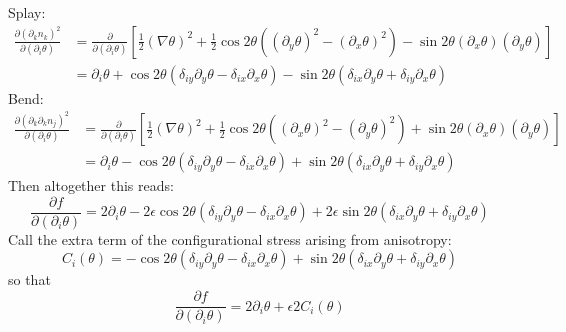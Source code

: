 \documentclass[reqno]{article}
\begin{document}
\noindent
Splay:
\begin{equation}
\begin{split}
    \frac{\partial (\partial_k n_k)^2}{\partial (\partial_i \theta)}
    &=
    \frac{\partial}{\partial (\partial_i \theta)}
    \left[
    \tfrac12 (\nabla \theta)^2 
    + \tfrac12 \cos2\theta \left((\partial_y \theta)^2 - (\partial_x \theta)^2\right)
    - \sin2\theta (\partial_x \theta)(\partial_y \theta)
    \right] \\
    &=
    \partial_i \theta
    + \cos 2 \theta \left(\delta_{iy} \partial_y \theta - \delta_{ix} \partial_x \theta \right)
    - \sin 2 \theta \left(\delta_{ix} \partial_y \theta + \delta_{iy} \partial_x \theta \right)
\end{split}
\end{equation}
Bend:
\begin{equation}
\begin{split}
    \frac{\partial (\partial_k \partial_k n_j)^2}{\partial (\partial_i \theta)}
    &=
    \frac{\partial}{\partial (\partial_i \theta)}
    \left[
    \tfrac12 (\nabla \theta)^2
    + \tfrac12 \cos2\theta \left((\partial_x \theta)^2 - (\partial_y \theta)^2\right)
    + \sin2\theta (\partial_x \theta)(\partial_y \theta)
    \right] \\
    &=
    \partial_i \theta
    - \cos 2 \theta \left(\delta_{iy} \partial_y \theta - \delta_{ix} \partial_x \theta \right)
    + \sin 2 \theta \left(\delta_{ix} \partial_y \theta + \delta_{iy} \partial_x \theta \right)
\end{split}
\end{equation}
Then altogether this reads:
\begin{equation}
    \frac{\partial f}{\partial (\partial_i \theta)}
    =
    2 \partial_i \theta
    - 2 \epsilon \cos 2 \theta \left(\delta_{iy} \partial_y \theta - \delta_{ix} \partial_x \theta \right)
    + 2 \epsilon \sin 2 \theta \left(\delta_{ix} \partial_y \theta + \delta_{iy} \partial_x \theta \right)
\end{equation}
Call the extra term of the configurational stress arising from anisotropy:
\begin{equation}
    C_i(\theta)
    =
    - \cos 2 \theta \left(\delta_{iy} \partial_y \theta - \delta_{ix} \partial_x \theta \right)
    + \sin 2 \theta \left(\delta_{ix} \partial_y \theta + \delta_{iy} \partial_x \theta \right)
\end{equation}
so that
\begin{equation}
    \frac{\partial f}{\partial (\partial_i \theta)}
    =
    2 \partial_i \theta
    + \epsilon 2 C_i(\theta)
\end{equation}
\end{document}
